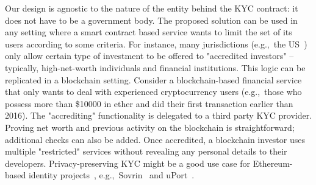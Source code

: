 Our design is agnostic to the nature of the entity behind the KYC contract: it does not have to be a government body.
The proposed solution can be used in any setting where a smart contract based service wants to limit the set of its users according to some criteria.
For instance, many jurisdictions (e.g.,~the US~\cite{SEC}) only allow certain type of investment to be offered to "accredited investors" -- typically, high-net-worth individuals and financial institutions.
This logic can be replicated in a blockchain setting.
Consider a blockchain-based financial service that only wants to deal with experienced cryptocurrency users (e.g.,~those who possess more than \$10000 in ether and did their first transaction earlier than 2016).
The "accrediting" functionality is delegated to a third party KYC provider.
Proving net worth and previous activity on the blockchain is straightforward; additional checks can also be added.
Once accredited, a blockchain investor uses multiple "restricted" services without revealing any personal details to their developers.
Privacy-preserving KYC might be a good use case for Ethereum-based identity projects~\cite{Mesropyan2017}, e.g.,~Sovrin~\cite{Sovrin} and uPort~\cite{Uport}.

